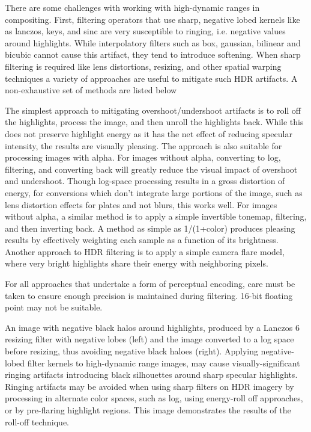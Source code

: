 There are some challenges with working with high-dynamic ranges in compositing. First, filtering operators that use sharp, negative lobed kernels like as lanczos, keys, and sinc are very susceptible to ringing, i.e. negative values around highlights. While interpolatory filters such as box, gaussian, bilinear and bicubic cannot cause this artifact, they tend to introduce softening. When sharp filtering is required like lens distortions, resizing, and other spatial warping techniques a variety of approaches are useful to mitigate such HDR artifacts. A non-exhaustive set of methods are listed below

The simplest approach to mitigating overshoot/undershoot artifacts is to roll off the highlights, process the image, and then unroll the highlights back. While this does not preserve highlight energy as it has the net effect of reducing specular intensity, the results are visually pleasing. The approach is also suitable for processing images with alpha.
For images without alpha, converting to log, filtering, and converting back will greatly reduce the visual impact of overshoot and undershoot. Though log-space processing results in a gross distortion of energy, for conversions which don’t integrate large portions of the image, such as lens distortion effects for plates and not blurs, this works well.
For images without alpha, a similar method is to apply a simple invertible tonemap, filtering, and then inverting back. A method as simple as 1/(1+color) produces pleasing results by effectively weighting each sample as a function of its brightness.
Another approach to HDR filtering is to apply a simple camera flare model, where very bright highlights share their energy with neighboring pixels.

For all approaches that undertake a form of perceptual encoding, care must be taken to ensure enough precision is maintained during filtering. 16-bit floating point may not be suitable.


An image with negative black halos around highlights, produced by a Lanczos 6 resizing filter with negative lobes (left) and the image converted to a log space before resizing, thus avoiding negative black haloes (right).
Applying negative-lobed filter kernels to high-dynamic range images, may cause visually-significant ringing artifacts introducing black silhouettes around sharp specular highlights. Ringing artifacts may be avoided when using sharp filters on HDR imagery by processing in alternate color spaces, such as log, using energy-roll off approaches, or by pre-flaring highlight regions. This image demonstrates the results of the roll-off technique.

